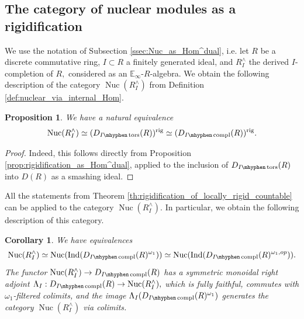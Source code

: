 \documentclass[11pt,leqno]{amsart}
\newtheorem{prop}[theo]{Proposition}
\newtheorem{cor}[theo]{Corollary}
\numberwithin{equation}{section}
\def\bS{\mathbb{S}}
\newcommand{\tens}[1]{%
  \mathbin{\mathop{\otimes}\displaylimits_{#1}}%
}
\newcommand{\hy}{\mhyphen}
\newcommand{\rig}{\operatorname{rig}}
\newcommand{\Nuc}{\operatorname{Nuc}}
\newcommand{\cont}{\operatorname{cont}}
\newcommand{\bE}{{\mathbb E}}
\newcommand{\cD}{{\mathcal D}}
\newcommand{\cC}{{\mathcal C}}
\newcommand{\Fun}{\operatorname{Fun}}
\newcommand{\Ind}{\operatorname{Ind}}
\newcommand{\Calk}{\operatorname{Calk}}
\newcommand{\coev}{\operatorname{coev}}
\newcommand{\tors}{\operatorname{tors}}
\newcommand{\compl}{\operatorname{compl}}
\begin{document}

\subsection{The category of nuclear modules as a rigidification}

We use the notation of Subsection \ref{ssec:Nuc_as_Hom^dual}, i.e. let $R$ be a discrete commutative ring, $I\subset R$ a finitely generated ideal, and $R^{\wedge}_I$ the derived $I$-completion of $R,$ considered as an $\bE_{\infty}$-$R$-algebra. We obtain the following description of the category $\Nuc(R^{\wedge}_I)$ from Definition \ref{def:nuclear_via_internal_Hom}.

\begin{prop}\label{prop:Nuc_via_rigidification} We have a natural equivalence
\begin{equation*}
\Nuc(R^{\wedge}_{I})\simeq (D_{I\hy \tors}(R))^{\rig}\simeq (D_{I\hy\compl}(R))^{\rig}.
\end{equation*}\end{prop} 

\begin{proof}Indeed, this follows directly from Proposition \ref{prop:rigidification_as_Hom^dual}, applied to the inclusion of $D_{I\hy\tors}(R)$ into $D(R)$ as a smashing ideal.\end{proof}

All the statements from Theorem \ref{th:rigidification_of_locally_rigid_countable} can be applied to the category $\Nuc(R^{\wedge}_I).$ In particular, we obtain the following description of this category.

\begin{cor}\label{cor:nuclear_via_colimits_of_trace-class}
We have equivalences
\begin{equation*}
\Nuc(R^{\wedge}_{I})\simeq \Nuc(\Ind(D_{I\hy\compl}(R)^{\omega_1}))\simeq \Nuc(\Ind(D_{I\hy\compl}(R)^{\omega_1,op})).
\end{equation*}
The functor $\Nuc(R^{\wedge}_{I})\to D_{I\hy\compl}(R)$ has a symmetric monoidal right adjoint $\Lambda_I:D_{I\hy\compl}(R)\to \Nuc(R^{\wedge}_{I}),$ which is fully faithful, commutes with $
\omega_1$-filtered colimits, and the image $\Lambda_I(D_{I\hy\compl}(R)^{\omega_1})$ generates the category $\Nuc(R^{\wedge}_I)$ via colimits.
\end{cor}
\end{document}
